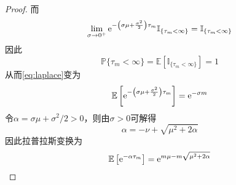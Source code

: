 \documentclass[cn]{homework}
\newcommand{\E}{\mathbb E}
\begin{document}
\begin{subproblem}
\begin{proof}
            而
            \[\lim_{\sigma\to0^+}
            \mathrm e^{-\left(\sigma\mu+\frac{\sigma^2}{2}\right)\tau_m}
            \mathbb I_{\{\tau_m<\infty\}}
            =\mathbb I_{\{\tau_m<\infty\}}\]
            因此
            \[\mathbb P\{\tau_m<\infty\}
            =\E\left[\mathbb I_{\{\tau_m<\infty\}}\right]=1\]
            从而\cref{eq:laplace}变为
            \[\E\left[\e^{-\left(\sigma\mu+\frac{\sigma^2}{2}\right)\tau_m}\right]
            =\e^{-\sigma m}\]
            令$\alpha=\sigma\mu+\sigma^2/2>0$，则由$\sigma>0$可解得
            \[\alpha=-\nu+\sqrt{\mu^2+2\alpha}\]
            因此拉普拉斯变换为
            \[\E\left[\e^{-\alpha\tau_m}\right]
            =\e^{m\mu-m\sqrt{\mu^2+2\alpha}}\]
            
        \end{proof}
    \end{subproblem}
\end{document}
